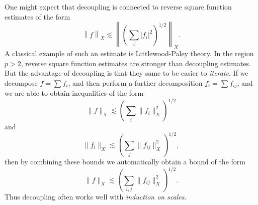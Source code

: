 One might expect that decoupling is connected to reverse square function estimates of the form
%
\[ \left\| f \right\|_X \lesssim \left\| \left( \sum_i |f_i|^2 \right)^{1/2} \right\|_X. \]
%
A classical example of such an estimate is Littlewood-Paley theory. In the region $p > 2$, reverse square function estimates are stronger than decoupling estimates. But the advantage of decoupling is that they same to be easier to \emph{iterate}. If we decompose $f = \sum f_i$, and then perform a further decomposition $f_i = \sum f_{ij}$, and we are able to obtain inequalities of the form
%
\[ \| f \|_X \lesssim \left( \sum_i \| f_i \|_X^2 \right)^{1/2} \]
%
and
%
\[ \| f_i \|_X \lesssim \left( \sum_j \| f_{ij} \|_X^2 \right)^{1/2}, \]
%
then by combining these bounds we automatically obtain a bound of the form
%
\[ \| f \|_X \lesssim \left( \sum_{i,j} \| f_{ij} \|_X^2 \right)^{1/2}. \]
%
Thus decoupling often works well with \emph{induction on scales}.


%
%






%


%

